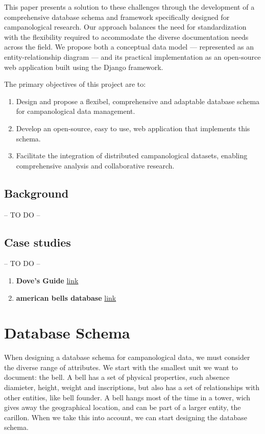 \documentclass[11pt, a4paper]{article}
\begin{document}
This paper presents a solution to these challenges through the development of a comprehensive database schema and framework specifically designed for campanological research. Our approach balances the need for standardization with the flexibility required to accommodate the diverse documentation needs across the field. We propose both a conceptual data model — represented as an entity-relationship diagram — and its practical implementation as an open-source web application built using the Django framework.

The primary objectives of this project are to:
\begin{enumerate}
    \item Design and propose a flexibel, comprehensive and adaptable database schema for campanological data management.
    \item Develop an open-source, easy to use, web application that implements this schema.
    \item Facilitate the integration of distributed campanological datasets, enabling comprehensive analysis and collaborative research.
\end{enumerate}

\subsection{Background}

-- TO DO --

\subsection{Case studies}

-- TO DO --

\begin{enumerate}
    \item \textbf{Dove's Guide} \href{https://dove.cccbr.org.uk/about#:~:text=Dove%E2%80%99s%20Guide%20is%20a%20resource,to%20other%20bells%20of%20interest}{link}
    \item \textbf{american bells database} \href{https://www.bells.org/}{link}
\end{enumerate}

    
\section{Database Schema}

When designing a database schema for campanological data, we must consider the diverse range of attributes.
We start with the smallest unit we want to document: the bell. A bell has a set of physical properties, such absence
diamieter, height, weight and inscriptions, but also has a set of relationships with other entities, like bell founder. 
A bell hangs most of the time in a tower, wich gives away the geographical location, and can be part of a larger entity, the carillon. 
When we take this into account, we can start designing the database schema.
\end{document}
